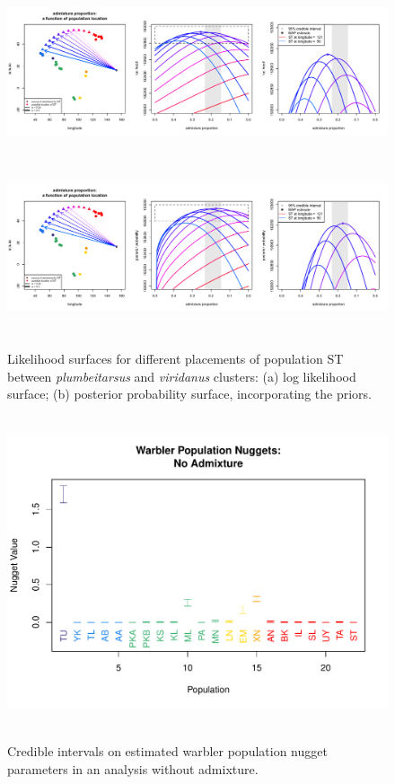\documentclass[12pt]{article}
\begin{document}
\begin{figure}
	\centering
			{\includegraphics[width=6in,height=2in]{figs/warblers/admix_prop_func_loc_lnl.png}}
			{\includegraphics[width=6in,height=2in]{figs/warblers/admix_prop_func_loc_prob.png}}
	\caption{Likelihood surfaces for different placements of population ST between \textit{plumbeitarsus} and \textit{viridanus} clusters: (a) log likelihood surface; (b) posterior probability surface, incorporating the priors.}\label{sfig:admix_prop_func_loc}
\end{figure}

\begin{figure}
\centering
	{\includegraphics[width=5in,height=3.6in]{figs/warblers/warb_pop_NoAd_nugget.pdf}}
	\caption{Credible intervals on estimated warbler population nugget parameters in an analysis without admixture.}\label{sfig:warb_pop_noad_nugg}
\end{figure}
\end{document}
